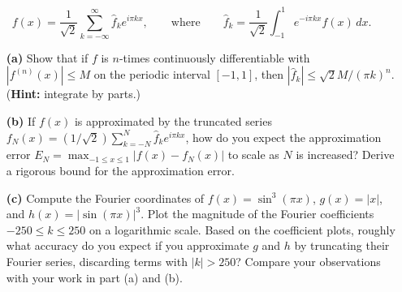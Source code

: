 \documentclass[12pt]{article}
\begin{document}
$$f(x) = \frac{1}{\sqrt{2}}\sum_{k=-\infty}^\infty \hat f_k e^{i\pi kx}, \qquad\text{where}\qquad \hat f_k = \frac{1}{\sqrt{2}}\int_{-1}^1 e^{-i\pi kx}f(x)\,dx.$$

\begin{itemize}
    \item[\textbf{(a)}] Show that if $f$ is $n$-times continuously differentiable with $|f^{(n)}(x)|\leq M$ on the periodic interval $[-1,1]$, then $|\hat f_k| \leq \sqrt{2}M/(\pi k)^n$. (\textbf{Hint:} integrate by parts.) 

	\item[\textbf{(b)}] If $f(x)$ is approximated by the truncated series $f_N(x) = (1/\sqrt{2})\sum_{k=-N}^N\hat f_k e^{i\pi k x}$, how do you expect the approximation error $E_N=\max_{-1\leq x\leq 1}|f(x)-f_N(x)|$ to scale as $N$ is increased? Derive a rigorous bound for the approximation error.

    \item[\textbf{(c)}] Compute the Fourier coordinates of $f(x) = \sin^3(\pi x)$, $g(x) = |x|$, and $h(x) = |\sin(\pi x)|^3$. Plot the magnitude of the Fourier coefficients $-250\leq k\leq 250$ on a logarithmic scale. Based on the coefficient plots, roughly what accuracy do you expect if you approximate $g$ and $h$ by truncating their Fourier series, discarding terms with $|k|>250$? Compare your observations with your work in part (a) and (b).
    
\end{itemize}
\end{document}
